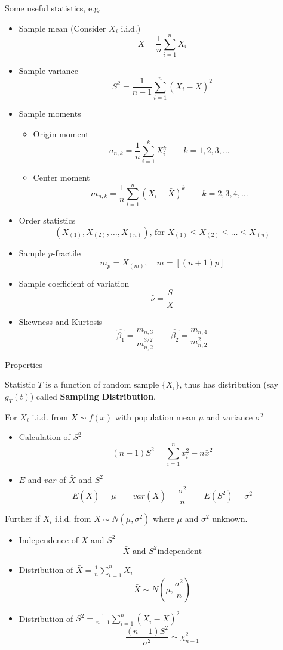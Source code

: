 \documentclass[11pt,a4paper]{ctexart}
\numberwithin{equation}{section}%
\begin{document}
    Some useful statistics, e.g.
    \begin{itemize}
        \item Sample mean (Consider $X_i$ i.i.d.)
        \[
            \bar{X}=\frac{1}{n}\sum_{i=1}^n X_i
        \]
        \item Sample variance
        \[
            S^2=\frac{1}{n-1}\sum_{i=1}^n(X_i-\bar{X})^2  
        \]
        \item Sample moments
        \begin{itemize}
            \item Origin moment
            \[
                a_{n,k}=\frac{1}{n}\sum_{i=1}^k X_i^k\qquad k=1,2,3,\ldots    
            \]
            \item Center moment
            \[
                m_{n,k}=\frac{1}{n}\sum_{i=1}^n (X_i-\bar{X})^k\qquad k=2,3,4,\ldots    
            \]
        \end{itemize}
        \item Order statistics
        \[
            (X_{(1)},X_{(2)},\ldots,X_{(n)}),\,\text{for }X_{(1)}\leq X_{(2)} \leq \ldots\leq X_{(n)}    
        \]
        \item Sample $p$-fractile
        \[
            m_p=X_{(m)},\quad m=[(n+1)p]   
        \]
        \item Sample coefficient of variation
        \[
            \hat{\nu}=\frac{S}{\bar{X}}    
        \]
        \item Skewness and Kurtosis
        \[
            \hat{\beta_1}=\frac{m_{n,3}}{m_{n,2}^{3/2}}\qquad \hat{\beta_2}=\frac{m_{n,4}}{m_{n,2}^2}    
        \]
    \end{itemize}

    Properties

    Statistic $T$ is a function of random sample $\{X_i\}$, thus has distribution (say $g_T(t)$) called \textbf{Sampling Distribution}.

        For $X_i$ i.i.d. from $X\sim f(x)$ with population mean $\mu$ and variance $\sigma^2$
    \begin{itemize}
        \item Calculation of $S^2$
        \[(n-1)S^2=\sum_{i=1}^n x_i^2-n\bar{x}^2\]
        \item $E$ and $var$ of $\bar{X}$ and $S^2$
        \[E(\bar{X})=\mu\qquad var(\bar{X})=\frac{\sigma^2}{n}\qquad E(S^2)=\sigma^2\]
    \end{itemize}

    Further if $X_i$ i.i.d. from $X\sim N(\mu,\sigma^2)$ where $\mu$ and $\sigma^2$ unknown.
    \begin{itemize}
        \item Independence of $\bar{X}$ and $S^2$ \[\bar{X}\text{ and }S^2 \text{independent}\]
        \item Distribution of $\bar{X}={\displaystyle\frac{1}{n}\sum_{i=1}^n X_i}$
        \[\bar{X}\sim N(\mu,\frac{\sigma^2}{n})\]
        \item Distribution of $S^2={\displaystyle\frac{1}{n-1}\sum_{i=1}^n(X_i-\bar{X})^2}$
        \[\frac{(n-1)S^2}{\sigma^2}\sim\chi^2_{n-1}\]
    \end{itemize}
\end{document}
